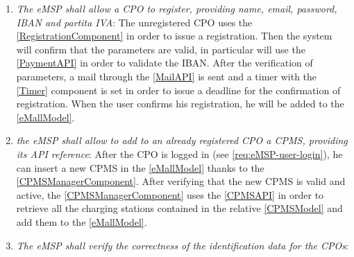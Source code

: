 \begin{enumerate}[label=\textbf{R\arabic*}]
          An \ac{eMSP} can interact with different \acp{CPO} thanks to the interface implemented by all the supported \acp{CPMS}.
          So a list of all the available \acp{CPO} is available in the \ref{eMallModel} as a list of \acp{CPO} which have, as a member, a list of \acp{CPMS}.
          The support for these \acp{CPMS} can be added through the \ref{CPMSManagerComponent} while the revenue percentage and special offers can be set through the \ref{CPOManagerComponent}.
          Finally, the \ref{CPMSAPI} permits to interact with the \ac{CPMS}.
          \label{req:eMSP-compatible}
    \item \textit{The \ac{eMSP} shall allow a \ac{CPO} to register, providing name, email, password, \ac{IBAN} and \gls{partita IVA}}:
          The unregistered \ac{CPO} uses the \ref{RegistrationComponent} in order to issue a registration.
          Then the system will confirm that the parameters are valid, in particular will use the \ref{PaymentAPI} in order to validate the \ac{IBAN}.
          After the verification of parameters, a mail through the \ref{MailAPI} is sent and a timer with the \ref{Timer} component is set in order to issue a deadline for the confirmation of registration.
          When the user confirms his registration, he will be added to the \ref{eMallModel}.
          \label{req:eMSP-cpo-registration}
    \item \textit{the \ac{eMSP} shall allow to add to an already registered \ac{CPO} a \ac{CPMS}, providing its \ac{API} reference}:
          After the \ac{CPO} is logged in (see \ref{req:eMSP-user-login}), he can insert a new \ac{CPMS} in the \ref{eMallModel} thanks to the \ref{CPMSManagerComponent}. After verifying that the new \ac{CPMS} is valid and active, the \ref{CPMSManagerComponent} uses the \ref{CPMSAPI} in order to retrieve all the charging stations contained in the relative \ref{CPMSModel} and add them to the \ref{eMallModel}.
          \label{req:eMSP-add-cpms}
    \item \textit{The \ac{eMSP} shall verify the correctness of the identification data for the \acp{CPO}}:

\end{enumerate}
